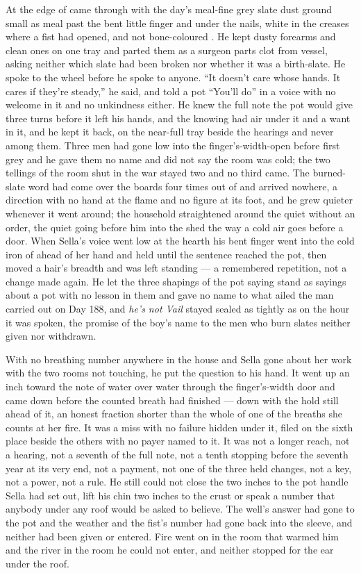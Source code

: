 At the edge of   came through with the day's meal-fine grey slate dust ground small as meal past the bent little finger and under the nails, white in the creases where a fist had opened, and not bone-coloured . He kept dusty forearms and clean ones on one tray and parted them as a surgeon parts clot from vessel, asking neither which slate had been broken nor whether it was a birth-slate. He spoke to the wheel before he spoke to anyone. “It doesn’t care whose hands. It cares if they’re steady,” he said, and told a pot “You’ll do” in a voice with no welcome in it and no unkindness either. He knew the full note the pot would give three turns before it left his hands, and the knowing had air under it and a want in it, and he kept it back, on the near-full tray beside the hearings and never among them. Three men had gone low into the finger's-width-open  before first grey and he gave them no name and did not say the room was cold; the two tellings of the room shut in the war stayed two and no third came. The burned-slate word had come over the boards four times out of  and arrived nowhere, a direction with no hand at the flame and no figure at its foot, and he grew quieter whenever it went around; the household straightened around the quiet without an order, the quiet going before him into the shed the way a cold air goes before a door. When Sella's voice went low at the hearth his bent finger went into the cold iron of  ahead of her hand and held until the sentence reached the pot, then moved a hair's breadth and was left standing --- a remembered repetition, not a change made again. He let the three shapings of the pot saying stand as sayings about a pot with no lesson in them and gave no name to what ailed the man carried out on Day 188, and \emph{he's not Vail} stayed sealed as tightly as on the hour it was spoken, the promise of the boy's name to the men who burn slates neither given nor withdrawn.

With no breathing number anywhere in the house and Sella gone about her work with the two rooms not touching, he put the question to his hand. It went up an inch toward the note of water over water through the finger's-width door and came down before the counted breath had finished --- down with the hold still ahead of it, an honest fraction shorter than the whole of one of the breaths she counts at her fire. It was a miss with no failure hidden under it, filed on the sixth place beside the others with no payer named to it. It was not a longer reach, not a hearing, not a seventh of the full note, not a tenth stopping before the seventh year at its very end, not a payment, not one of the three held changes, not a key, not a power, not a rule. He still could not close the two inches to the pot handle Sella had set out, lift his chin two inches to the crust or speak a number that anybody under any roof would be asked to believe. The well's answer had gone to the pot and the weather and the fist's number had gone back into the sleeve, and neither had been given or entered. Fire went on in the room that warmed him and the river in the room he could not enter, and neither stopped for the ear under the roof.
